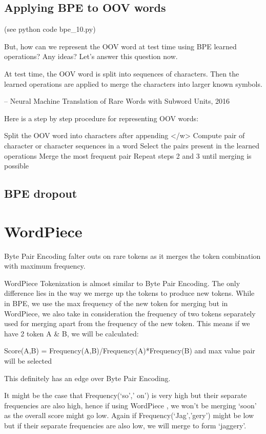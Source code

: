 \subsection{Applying BPE to OOV words}

(see python code bpe\_10.py)

But, how can we represent the OOV word at test time using BPE learned operations? Any ideas? Let’s answer this question now.

    At test time, the OOV word is split into sequences of characters. Then the learned operations are applied to merge the characters into larger known symbols.

    – Neural Machine Translation of Rare Words with Subword Units, 2016

Here is a step by step procedure for representing OOV words:

    Split the OOV word into characters after appending </w>
    Compute pair of character or character sequences in a word
    Select the pairs present in the learned operations
    Merge the most frequent pair
    Repeat steps 2 and 3 until merging is possible

\subsection{BPE dropout}

\section{WordPiece}

Byte Pair Encoding falter outs on rare tokens as it merges the token combination with maximum frequency.

WordPiece Tokenization is almost similar to Byte Pair Encoding. The only difference lies in the way we merge up the tokens to produce new tokens. While in BPE, we use the max frequency of the new token for merging but in WordPiece, we also take in consideration the frequency of two tokens separately used for merging apart from the frequency of the new token. This means if we have 2 token A \& B, we will be calculated:

Score(A,B) = Frequency(A,B)/Frequency(A)*Frequency(B) and max value pair will be selected

This definitely has an edge over Byte Pair Encoding.

It might be the case that Frequency(‘so’,’ on’) is very high but their separate frequencies are also high, hence if using WordPiece , we won’t be merging ‘soon’ as the overall score might go low. Again if Frequency(‘Jag’,’gery’) might be low but if their separate frequencies are also low, we will merge to form ‘jaggery’.

